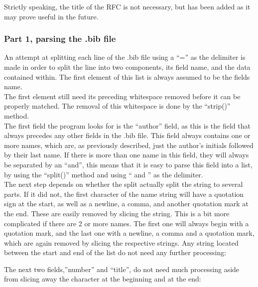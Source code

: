 \documentclass[a4paper,english]{report}
\begin{document}
Strictly speaking, the title of the RFC is not necessary, but has been added as it may prove useful in the future.

\subsubsection{Part 1, parsing the .bib file}

An attempt at splitting each line of the .bib file using a “=” as the delimiter is made in order to split the line into two components, its field name, and the data contained within. The first element of this list is always assumed to be the fields name.\\

The first element still need its preceding whitespace removed before it can be properly matched. The removal of this whitespace is done by the “strip()” method.\\

The first field the program looks for is the “author” field, as this is the field that always precedes any other fields in the .bib file.
This field always contains one or more names, which are, as previously described, just the author's initials followed by their last name. If there is more than one name in this field, they will always be separated by an “and”, this means that it is easy to parse this field into a list, by using the “split()” method and using “  and ” as the delimiter.\\




The next step depends on whether the split actually split the string to several parts. If it did not, the first character of the name string will have a quotation sign at the start, as well as a newline, a comma, and another quotation mark at the end. These are easily removed by slicing the string.
This is a bit more complicated if there are 2 or more names.
The first one will always begin with a quotation mark, and the last one with a newline, a comma and a quotation mark, which are again removed by slicing the respective strings. Any string located between the start and end of the list do not need any further processing: 




The next two fields,”number” and “title”, do not need much processing aside from slicing away the character at the beginning and at the end:
\end{document}
